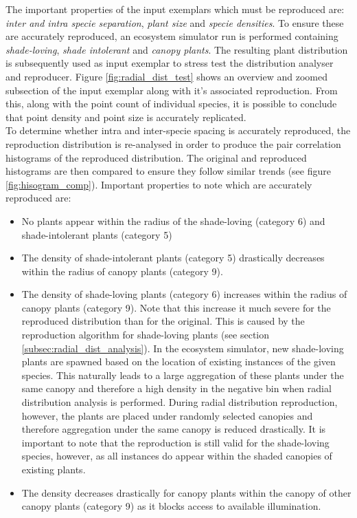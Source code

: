 The important properties of the input exemplars which must be reproduced are: \textit{inter and intra specie separation}, \textit{plant size} and \textit{specie densities}. To ensure these are accurately reproduced, an ecosystem simulator run is performed containing \textit{shade-loving}, \textit{shade intolerant} and \textit{canopy plants}. The resulting plant distribution is subsequently used as input exemplar to stress test the distribution analyser and reproducer. Figure \ref{fig:radial_dist_test} shows an overview and zoomed subsection of the input exemplar along with it's associated reproduction. From this, along with the point count of individual species, it is possible to conclude that point density and point size is accurately replicated.\\
To determine whether intra and inter-specie spacing is accurately reproduced, the reproduction distribution is re-analysed in order to produce the pair correlation histograms of the reproduced distribution. The original and reproduced histograms are then compared to ensure they follow similar trends (see figure \ref{fig:hisogram_comp}). Important properties to note which are accurately reproduced are:
\begin{itemize}
\item No plants appear within the radius of the shade-loving (category 6) and shade-intolerant plants (category 5)
\item The density of shade-intolerant plants (category 5) drastically decreases within the radius of canopy plants (category 9).
\item The density of shade-loving plants (category 6) increases within the radius of canopy plants (category 9). Note that this increase it much severe for the reproduced distribution than for the original. This is caused by the reproduction algorithm for shade-loving plants (see section \ref{subsec:radial_dist_analysis}). In the ecosystem simulator, new shade-loving plants are spawned based on the location of existing instances of the given species. This naturally leads to a large aggregation of these plants under the same canopy and therefore a high density in the negative bin when radial distribution analysis is performed. During radial distribution reproduction, however, the plants are placed under randomly selected canopies and therefore aggregation under the same canopy is reduced drastically. It is important to note that the reproduction is still valid for the shade-loving species, however, as all instances do appear within the shaded canopies of existing plants.
\item The density decreases drastically for canopy plants within the canopy of other canopy plants (category 9) as it blocks access to available illumination.
\end{itemize}

